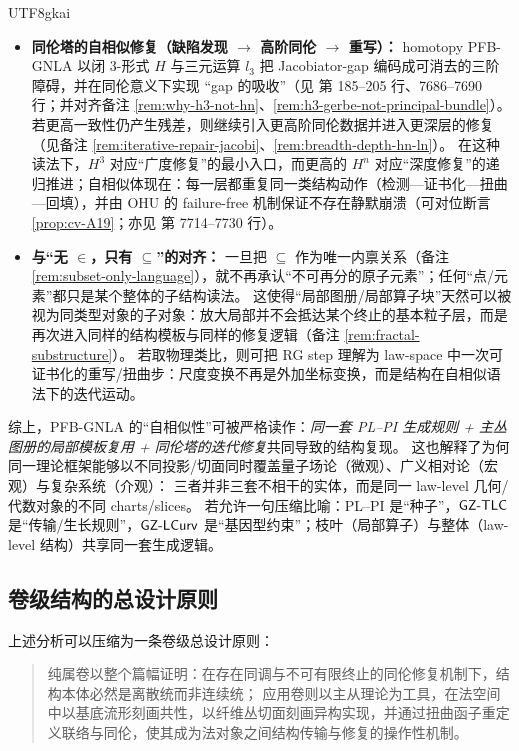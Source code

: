 \documentclass[12pt]{article}
\begin{document}
\begin{CJK*}{UTF8}{gkai}
\begin{itemize}
  \item \textbf{同伦塔的自相似修复（缺陷发现 $\to$ 高阶同伦 $\to$ 重写）：}
        homotopy PFB-GNLA 以闭 3-形式 $H$ 与三元运算 $l_3$ 把 Jacobiator-gap 编码成可消去的三阶障碍，并在同伦意义下实现 “gap
      的吸收”（见\cite{GaoZheng2025GFramework} 第 185--205 行、7686--7690 行；并对齐备注 \ref{rem:why-h3-not-hn}、\ref{rem:h3-gerbe-not-principal-bundle}）。
        若更高一致性仍产生残差，则继续引入更高阶同伦数据并进入更深层的修复（见备注 \ref{rem:iterative-repair-jacobi}、\ref{rem:breadth-depth-hn-ln}）。
        在这种读法下，$H^3$ 对应“广度修复”的最小入口，而更高的 $H^n$ 对应“深度修复”的递归推进；自相似体现在：每一层都重复同一类结构动作（检测---证书化---扭曲---回填），并由 OHU 的
      failure-free 机制保证不存在静默崩溃（可对位断言 \ref{prop:cv-A19}；亦见\cite{GaoZheng2025GFramework} 第 7714--7730 行）。

  \item \textbf{与“无 $\in$，只有 $\subseteq$”的对齐：}
        一旦把 $\subseteq$ 作为唯一内禀关系（备注 \ref{rem:subset-only-language}），就不再承认“不可再分的原子元素”；任何“点/元素”都只是某个整体的子结构读法。
        这使得“局部图册/局部算子块”天然可以被视为同类型对象的子对象：放大局部并不会抵达某个终止的基本粒子层，而是再次进入同样的结构模板与同样的修复逻辑（备注 \ref{rem:fractal-substructure}）。
        若取物理类比，则可把 RG step 理解为 law-space 中一次可证书化的重写/扭曲步：尺度变换不再是外加坐标变换，而是结构在自相似语法下的迭代运动。
\end{itemize}

综上，PFB-GNLA 的“自相似性”可被严格读作：\emph{同一套 PL--PI 生成规则 + 主丛图册的局部模板复用 + 同伦塔的迭代修复}共同导致的结构复现。
这也解释了为何同一理论框架能够以不同投影/切面同时覆盖量子场论（微观）、广义相对论（宏观）与复杂系统（介观）：
三者并非三套不相干的实体，而是同一 law-level 几何/代数对象的不同 charts/slices。
若允许一句压缩比喻：PL--PI 是“种子”，$\mathsf{GZ\text{-}TLC}$ 是“传输/生长规则”，$\mathsf{GZ\text{-}LCurv}$ 是“基因型约束”；枝叶（局部算子）与整体（law-level 结构）共享同一套生成逻辑。

\subsection{卷级结构的总设计原则}

上述分析可以压缩为一条卷级总设计原则：
\begin{quote}
纯属卷以整个篇幅证明：在存在同调与不可有限终止的同伦修复机制下，结构本体必然是离散统而非连续统；
应用卷则以主从理论为工具，在法空间中以基底流形刻画共性，以纤维丛切面刻画异构实现，并通过扭曲函子重定义联络与同伦，使其成为法对象之间结构传输与修复的操作性机制。
\end{quote}



\end{CJK*}
\end{document}
